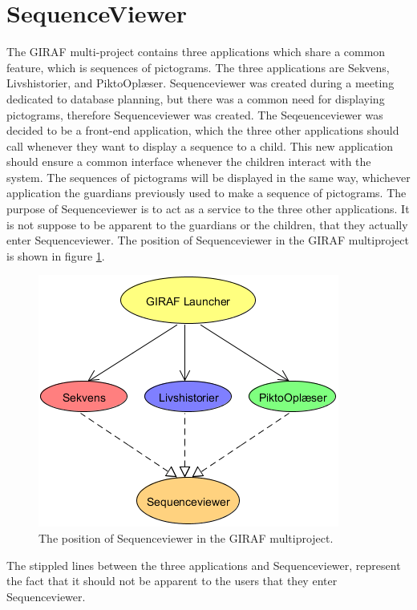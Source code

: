 \section{SequenceViewer}\label{sec:sequenceviewer}
The GIRAF multi-project contains three applications which share a common feature, which is sequences of pictograms. The three applications are Sekvens, Livshistorier, and PiktoOplæser. Sequenceviewer was created during a meeting dedicated to database planning, but there was a common need for displaying pictograms, therefore Sequenceviewer was created. The Seqeuenceviewer was decided to be a front-end application, which the three other applications should call whenever they want to display a sequence to a child. This new application should ensure a common interface whenever the children interact with the system. The sequences of pictograms will be displayed in the same way, whichever application the guardians previously used to make a sequence of pictograms.
The purpose of Sequenceviewer is to act as a service to the three other applications. It is not suppose to be apparent to the guardians or the children, that they actually enter Sequenceviewer. The position of Sequenceviewer in the GIRAF multiproject is shown in figure \ref{fig:sequenceviewer}.
\begin{figure}[H]
	\centering
	\includegraphics[scale=0.8]{Pics/sequenceviewer}
	\caption{The position of Sequenceviewer in the GIRAF multiproject.}
	\label{fig:sequenceviewer}
\end{figure}
The stippled lines between the three applications and Sequenceviewer, represent the fact that it should not be apparent to the users that they enter Sequenceviewer.

